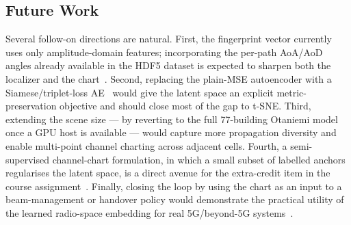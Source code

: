 \subsection*{Future Work}

Several follow-on directions are natural.
First, the fingerprint vector currently uses only amplitude-domain
features; incorporating the per-path AoA/AoD angles already available in
the HDF5 dataset is expected to sharpen both the localizer and the
chart~\cite{hoydis2023sionna_rt,3gpp_nr_channel}.
Second, replacing the plain-MSE autoencoder with a
Siamese/triplet-loss AE~\cite{lei2019siamese_cc} would give the latent
space an explicit metric-preservation objective and should close most of
the gap to t-SNE.
Third, extending the scene size --- by reverting to the full 77-building
Otaniemi model once a GPU host is available --- would capture more
propagation diversity and enable multi-point channel charting across
adjacent cells.
Fourth, a semi-supervised channel-chart formulation, in which a small
subset of labelled anchors regularises the latent space, is a direct
avenue for the extra-credit item in the course
assignment~\cite{studer2018channel_charting}.
Finally, closing the loop by using the chart as an input to a
beam-management or handover policy would demonstrate the practical
utility of the learned radio-space embedding for real 5G/beyond-5G
systems~\cite{sionna2022}.
